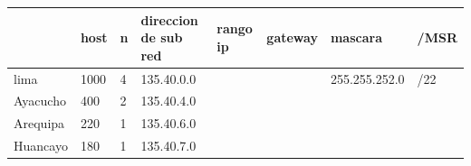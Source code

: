 \begin{table}[htbp]
\begin{tabular}{@{}llllllll@{}}
\toprule
\rowcolor[HTML]{32CB00} 
\multicolumn{1}{|l|}{\cellcolor[HTML]{32CB00}\textbf{subred}} & \multicolumn{1}{l|}{\cellcolor[HTML]{32CB00}\textbf{host}} & \multicolumn{1}{l|}{\cellcolor[HTML]{32CB00}\textbf{n}} & \multicolumn{1}{l|}{\cellcolor[HTML]{32CB00}\textbf{direccion de sub red}} & \multicolumn{1}{l|}{\cellcolor[HTML]{32CB00}\textbf{rango ip}} & \multicolumn{1}{l|}{\cellcolor[HTML]{32CB00}\textbf{gateway}} & \multicolumn{1}{l|}{\cellcolor[HTML]{32CB00}\textbf{mascara}} & \multicolumn{1}{l|}{\cellcolor[HTML]{32CB00}\textbf{/MSR}} \\ \midrule
\multicolumn{1}{|l|}{lima}                                    & \multicolumn{1}{l|}{1000}                                  & \multicolumn{1}{l|}{4}                                  & \multicolumn{1}{l|}{135.40.0.0}                                            & \multicolumn{1}{l|}{}                                          & \multicolumn{1}{l|}{}                                         & \multicolumn{1}{l|}{255.255.252.0}                            & \multicolumn{1}{l|}{/22}                                   \\ \midrule
\multicolumn{1}{|l|}{Ayacucho}                                & \multicolumn{1}{l|}{400}                                   & \multicolumn{1}{l|}{2}                                  & \multicolumn{1}{l|}{135.40.4.0}                                            & \multicolumn{1}{l|}{}                                          & \multicolumn{1}{l|}{}                                         & \multicolumn{1}{l|}{}                                         & \multicolumn{1}{l|}{}                                      \\ \midrule
\multicolumn{1}{|l|}{Arequipa}                                & \multicolumn{1}{l|}{220}                                   & \multicolumn{1}{l|}{1}                                  & \multicolumn{1}{l|}{135.40.6.0}                                            & \multicolumn{1}{l|}{}                                          & \multicolumn{1}{l|}{}                                         & \multicolumn{1}{l|}{}                                         & \multicolumn{1}{l|}{}                                      \\ \midrule
\multicolumn{1}{|l|}{Huancayo}                                & \multicolumn{1}{l|}{180}                                   & \multicolumn{1}{l|}{1}                                  & \multicolumn{1}{l|}{135.40.7.0}                                            & \multicolumn{1}{l|}{}                                          & \multicolumn{1}{l|}{}                                         & \multicolumn{1}{l|}{}                                         & \multicolumn{1}{l|}{}                                      \\ \midrule

\end{tabular}
\end{table}
